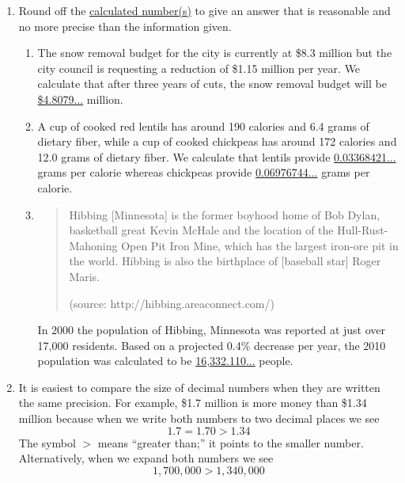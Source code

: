 \begin{enumerate}
\newpage

\item Round off the \underline{calculated number(s)} to give an answer that is reasonable and no more precise than the information given.

\begin{enumerate}
\item The snow removal budget for the city is currently at \$8.3 million but the city council is requesting a reduction of \$1.15 million per year.  We calculate that after three years of cuts, the snow removal budget will be \underline{\$4.8079...} million. 
\vfill
\item A cup of cooked red lentils has around 190 calories and 6.4 grams of dietary fiber, while a cup of cooked chickpeas has around 172 calories and 12.0 grams of dietary fiber.  We calculate that lentils provide \underline{0.03368421...} grams per calorie whereas chickpeas provide \underline{0.06976744...} grams per calorie. 
\vfill
\item \begin{quote} Hibbing [Minnesota] is the former boyhood home of Bob Dylan, basketball great Kevin McHale and the location of the Hull-Rust-Mahoning Open Pit Iron Mine, which has the largest iron-ore pit in the world. Hibbing is also the birthplace of [baseball star] Roger Maris.

\hfill \begin{tiny} (source: http://hibbing.areaconnect.com/)\end{tiny}\end{quote}  

In 2000 the population of Hibbing, Minnesota was reported at just over 17,000 residents. Based on a projected 0.4\% decrease per year, the 2010 population was calculated to be \underline{16,332.110...} people. 
\vfill
\end{enumerate}

\newpage

\item It is easiest to compare the size of decimal numbers when they are written the same precision.  For example, \$1.7 million is more money than \$1.34 million because when we write both numbers to two decimal places we see $$1.7 = 1.70 > 1.34$$  The symbol $>$ means ``greater than;'' it points to the smaller number.  Alternatively, when we expand both numbers we see $$1,700,000  > 1,340,000$$  


\end{enumerate}
